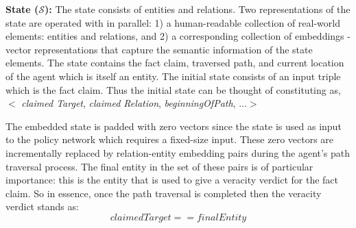 \noindent \textbf{State ($\mathcal{S}$):} The state consists of entities and relations. Two representations of the state are operated with in parallel: 
1) a human-readable collection of real-world elements: entities and relations, and 
2) a corresponding collection of embeddings - vector representations that capture the semantic information of the state elements. The state contains the fact claim, traversed path, and current location of the agent which is itself an entity. The initial state consists of an input triple which is the fact claim. %
Thus the initial state can be thought of constituting as, %
$<$ \textit{claimed Target}, \textit{claimed Relation}, \textit{beginningOfPath}, ...$>$

The embedded state is padded with zero vectors since the state is used as input to the policy network which requires a fixed-size input. These zero vectors are incrementally replaced by relation-entity embedding pairs during the agent's path traversal process. The final entity in the set of these pairs is of particular importance: this is the entity that is used to give a veracity verdict for the fact claim. So in essence, once the path traversal is completed then the veracity verdict stands as: $$claimedTarget == finalEntity$$

